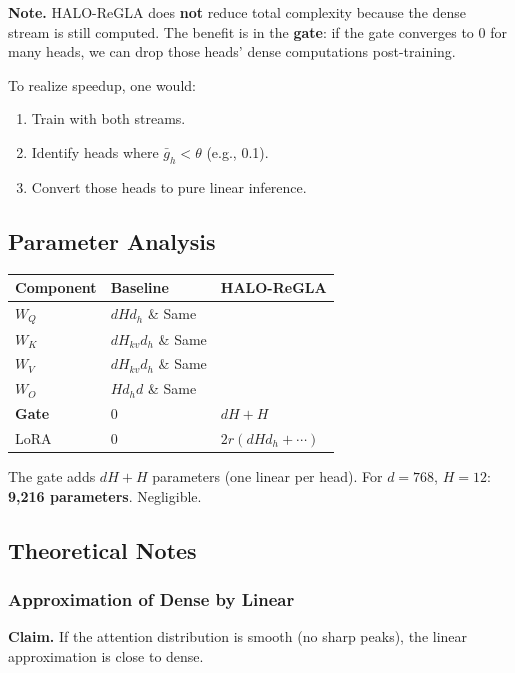 \textbf{Note.} HALO-ReGLA does \textbf{not} reduce total complexity because the dense 
stream is still computed. The benefit is in the \textbf{gate}: if the gate 
converges to 0 for many heads, we can drop those heads' dense computations 
post-training.

To realize speedup, one would:
\begin{enumerate}
\item Train with both streams.
\item Identify heads where $\bar{g}_h < \theta$ (e.g., 0.1).
\item Convert those heads to pure linear inference.

\end{enumerate}
\subsection{Parameter Analysis}

\begin{table}[H]
\centering
\small
\begin{tabular}{lll}
\toprule
\textbf{Component} & \textbf{Baseline} & \textbf{HALO-ReGLA} \\
\midrule
$W_Q$ & $d H d_h$ \& Same \\
$W_K$ & $d H_{kv} d_h$ \& Same \\
$W_V$ & $d H_{kv} d_h$ \& Same \\
$W_O$ & $H d_h d$ \& Same \\
\textbf{Gate} & 0 & $d H + H$ \\
LoRA & 0 & $2 r (d H d_h + \cdots)$ \\
\bottomrule
\end{tabular}
\end{table}

The gate adds $d H + H$ parameters (one linear per head). For $d = 768$, 
$H = 12$: \textbf{9,216 parameters}. Negligible.

\subsection{Theoretical Notes}

\subsubsection{Approximation of Dense by Linear}

\textbf{Claim.} If the attention distribution is smooth (no sharp peaks), the 
linear approximation is close to dense.

